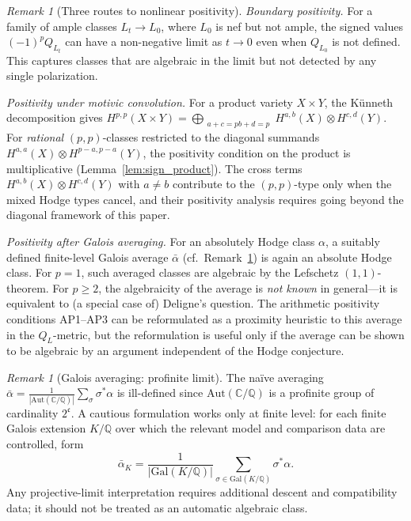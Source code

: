 \documentclass[aps,prd,twocolumn,superscriptaddress,nofootinbib]{revtex4-2}
\theoremstyle{definition}
\theoremstyle{remark}
\newtheorem{remark}[theorem]{Remark}
\def\\{ }%
\begin{document}
\begin{remark}[Three routes to nonlinear positivity]
\label{rem:nonlinear-positivity}
\emph{Boundary positivity.}
For a family of ample classes $L_t \to L_0$, where $L_0$ is nef but not ample, the signed values $(-1)^p Q_{L_t}$ can have a non-negative limit as $t \to 0$ even when $Q_{L_0}$ is not defined. This captures classes that are algebraic in the limit but not detected by any single polarization.

\emph{Positivity under motivic convolution.}
For a product variety $X \times Y$, the Künneth decomposition gives $H^{p,p}(X \times Y) = \bigoplus_{\substack{a+c=p \\ b+d=p}} H^{a,b}(X) \otimes H^{c,d}(Y)$. For \emph{rational} $(p,p)$-classes restricted to the diagonal summands $H^{a,a}(X) \otimes H^{p-a,p-a}(Y)$, the positivity condition on the product is multiplicative (Lemma~\ref{lem:sign_product}). The cross terms $H^{a,b}(X) \otimes H^{c,d}(Y)$ with $a \neq b$ contribute to the $(p,p)$-type only when the mixed Hodge types cancel, and their positivity analysis requires going beyond the diagonal framework of this paper.

\emph{Positivity after Galois averaging.}
For an absolutely Hodge class $\alpha$, a suitably defined finite-level Galois average $\bar\alpha$ (cf.\ Remark~\ref{rem:galois-profinite}) is again an absolute Hodge class. For $p = 1$, such averaged classes are algebraic by the Lefschetz $(1,1)$-theorem. For $p \geq 2$, the algebraicity of the average is \emph{not known} in general---it is equivalent to (a special case of) Deligne's question. The arithmetic positivity conditions AP1--AP3 can be reformulated as a proximity heuristic to this average in the $Q_L$-metric, but the reformulation is useful only if the average can be shown to be algebraic by an argument independent of the Hodge conjecture.
\end{remark}

\begin{remark}[Galois averaging: profinite limit]\label{rem:galois-profinite}
The naïve averaging $\bar{\alpha} = \frac{1}{|\mathrm{Aut}(\mathbb{C}/\mathbb{Q})|} \sum_\sigma \sigma^*\alpha$ is ill-defined since $\mathrm{Aut}(\mathbb{C}/\mathbb{Q})$ is a profinite group of cardinality $2^{\mathfrak{c}}$. A cautious formulation works only at finite level: for each finite Galois extension $K/\mathbb{Q}$ over which the relevant model and comparison data are controlled, form
\[
\bar{\alpha}_K = \frac{1}{|\mathrm{Gal}(K/\mathbb{Q})|}
  \sum_{\sigma \in \mathrm{Gal}(K/\mathbb{Q})} \sigma^*\alpha.
\]
Any projective-limit interpretation requires additional descent and compatibility data; it should not be treated as an automatic algebraic class.
\end{remark}
\end{document}
